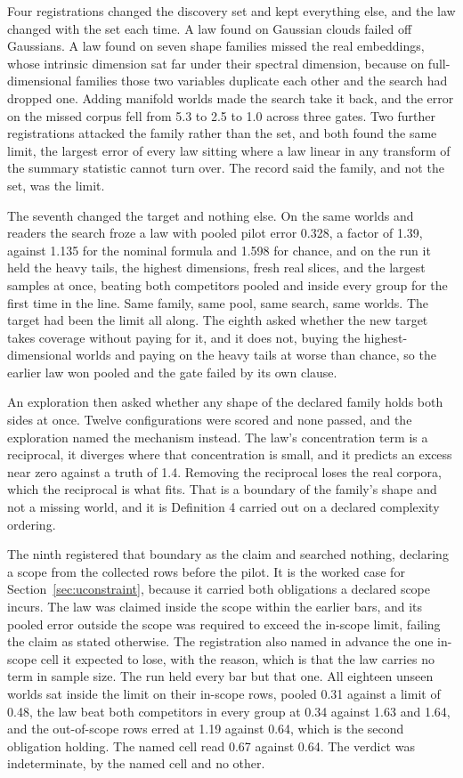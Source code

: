 \documentclass[11pt]{article}
\theoremstyle{remark}
\begin{document}
Four registrations changed the discovery set and kept everything else, and the law
changed with the set each time. A law found on Gaussian clouds failed off
Gaussians. A law found on seven shape families missed the real embeddings, whose
intrinsic dimension sat far under their spectral dimension, because on
full-dimensional families those two variables duplicate each other and the search
had dropped one. Adding manifold worlds made the search take it back, and the error
on the missed corpus fell from 5.3 to 2.5 to 1.0 across three gates. Two further
registrations attacked the family rather than the set, and both found the same
limit, the largest error of every law sitting where a law linear in any transform
of the summary statistic cannot turn over. The record said the family, and not the
set, was the limit.

The seventh changed the target and nothing else. On the same worlds and readers the
search froze a law with pooled pilot error 0.328, a factor of 1.39, against 1.135
for the nominal formula and 1.598 for chance, and on the run it held the heavy
tails, the highest dimensions, fresh real slices, and the largest samples at once,
beating both competitors pooled and inside every group for the first time in the
line. Same family, same pool, same search, same worlds. The target had been the
limit all along. The eighth asked whether the new target takes coverage without
paying for it, and it does not, buying the highest-dimensional worlds and paying on
the heavy tails at worse than chance, so the earlier law won pooled and the gate
failed by its own clause.

An exploration then asked whether any shape of the declared family holds both sides
at once. Twelve configurations were scored and none passed, and the exploration
named the mechanism instead. The law's concentration term is a reciprocal, it
diverges where that concentration is small, and it predicts an excess near zero
against a truth of 1.4. Removing the reciprocal loses the real corpora, which the
reciprocal is what fits. That is a boundary of the family's shape and not a missing
world, and it is Definition 4 carried out on a declared complexity ordering.

The ninth registered that boundary as the claim and searched nothing, declaring a
scope from the collected rows before the pilot. It is the worked case for
Section~\ref{sec:uconstraint}, because it carried both obligations a declared scope
incurs. The law was claimed inside the scope within the earlier bars, and its
pooled error outside the scope was required to exceed the in-scope limit, failing
the claim as stated otherwise. The registration also named in advance the one
in-scope cell it expected to lose, with the reason, which is that the law carries
no term in sample size. The run held every bar but that one. All eighteen unseen
worlds sat inside the limit on their in-scope rows, pooled 0.31 against a limit of
0.48, the law beat both competitors in every group at 0.34 against 1.63 and 1.64,
and the out-of-scope rows erred at 1.19 against 0.64, which is the second
obligation holding. The named cell read 0.67 against 0.64. The verdict was
indeterminate, by the named cell and no other.
\end{document}
